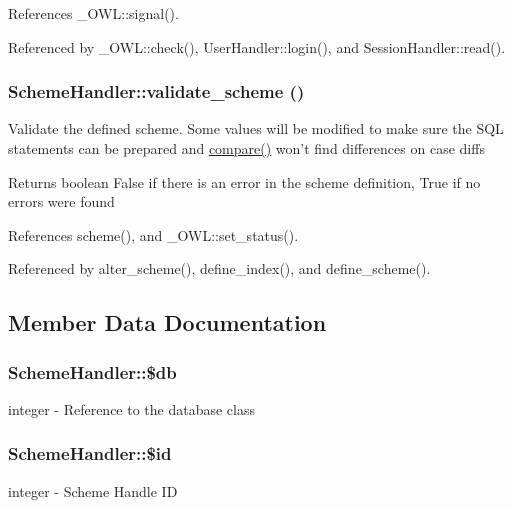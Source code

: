 References \_\-OWL::signal().



Referenced by \_\-OWL::check(), UserHandler::login(), and SessionHandler::read().

\subsubsection[{validate\_\-scheme}]{\setlength{\rightskip}{0pt plus 5cm}SchemeHandler::validate\_\-scheme ()}\label{classSchemeHandler_a1d92dea6ea4643959609959bdce6f0d1}
Validate the defined scheme. Some values will be modified to make sure the SQL statements can be prepared and \hyperlink{classSchemeHandler_ae2a981feae465ef5e46782b4a18da1ad}{compare()} won't find differences on case diffs

\begin{DoxyReturn}{Returns}
boolean False if there is an error in the scheme definition, True if no errors were found 
\end{DoxyReturn}


References scheme(), and \_\-OWL::set\_\-status().



Referenced by alter\_\-scheme(), define\_\-index(), and define\_\-scheme().



\subsection{Member Data Documentation}
\subsubsection[{\$db}]{\setlength{\rightskip}{0pt plus 5cm}SchemeHandler::\$db}\label{classSchemeHandler_abf3bf26e35b759ccd49f358dedc2dfd1}
integer -\/ Reference to the database class 
\subsubsection[{\$id}]{\setlength{\rightskip}{0pt plus 5cm}SchemeHandler::\$id}\label{classSchemeHandler_af297e966eae06ff1e38a143f93b4aeb9}
integer -\/ Scheme Handle ID 
